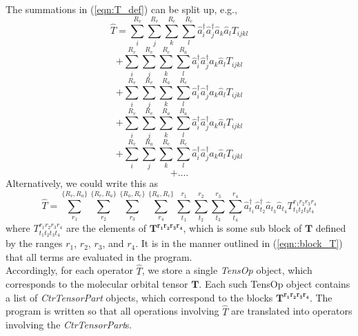 \documentclass[12pt]{article}
\begin{document}
\noindent The summations in  (\ref{eqn:T_def}) can be split up, e.g.,
\begin{equation*}
\hat{T} =  \sum_{i}^{R_{v}}\sum_{j}^{R_{v}}\sum_{k}^{R_{c}}\sum_{l}^{R_{c}}\hat{a}^{\dagger}_{i} \hat{a}^{\dagger}_{j} \hat{a}_{k} \hat{a}_{l} T_{ijkl}
\end{equation*}
\begin{equation*}
+  \sum_{i}^{R_{v}}\sum_{j}^{R_{v}}\sum_{k}^{R_{c}}\sum_{l}^{R_{a}}\hat{a}^{\dagger}_{i} \hat{a}^{\dagger}_{j} \hat{a}_{k} \hat{a}_{l} T_{ijkl}
\end{equation*}
\begin{equation*}
+ \sum_{i}^{R_{v}}\sum_{j}^{R_{v}}\sum_{k}^{R_{a}}\sum_{l}^{R_{c}}\hat{a}^{\dagger}_{i} \hat{a}^{\dagger}_{j} \hat{a}_{k} \hat{a}_{l} T_{ijkl}
\end{equation*}
\begin{equation*}
+ \sum_{i}^{R_{v}}\sum_{j}^{R_{v}}\sum_{k}^{R_{a}}\sum_{l}^{R_{a}}\hat{a}^{\dagger}_{i} \hat{a}^{\dagger}_{j} \hat{a}_{k} \hat{a}_{l} T_{ijkl}
\end{equation*}
\begin{equation*}
+ \sum_{i}^{R_{v}}\sum_{j}^{R_{a}}\sum_{k}^{R_{c}}\sum_{l}^{R_{c}}\hat{a}^{\dagger}_{i} \hat{a}^{\dagger}_{j} \hat{a}_{k} \hat{a}_{l} T_{ijkl}
\end{equation*}
\begin{equation*}
+ .... 
\end{equation*}
\noindent  Alternatively, we could write this as
\begin{equation*}
\hat{T} =
 \sum_{r_{1}}^{\{R_{v},R_{a}\}} \sum_{r_{2}}^{\{R_{v},R_{a}\}} \sum_{r_{3}}^{\{R_{a},R_{c}\}} \sum^{\{R_{a},R_{c}\}}_{r_{4}}
 \sum_{t_{1}}^{r_{1}}\sum_{t_{2}}^{r_{2}}\sum_{t_{3}}^{r_{3}}\sum_{t_{4}}^{r_{4}}
\hat{a}^{\dagger}_{t_{1}} \hat{a}^{\dagger}_{t_{2}} \hat{a}_{t_{3}} \hat{a}_{t_{4}} T^{r_{1}r_{2}r_{3}r_{4}}_{t_{1}t_{2}t_{3}t_{4}}
\label{eqn::block_T} 
\end{equation*}
\noindent where $T^{r_{1}r_{2}r_{3}r_{4}}_{t_{1}t_{2}t_{3}t_{4}}$ are the elements of $\mathbf{T^{r_{1}r_{2}r_{3}r_{4}}}$, which is some
sub block of $\mathbf{T}$ defined by the ranges $r_{1}$, $r_{2}$,
$r_{3}$, and $r_{4}$. It is in the manner outlined in (\ref{eqn::block_T}) that all terms are evaluated in the program.\\

\noindent Accordingly, for each operator $\hat{T}$, we store a single \emph{TensOp} object, which corresponds
to the molecular orbital tensor $\mathbf{T}$.  Each such TensOp object contains a list of \emph{CtrTensorPart}
objects, which correspond to the blocks $\mathbf{T^{r_{1}r_{2}r_{3}r_{4}}}$. The program is
written so that all operations involving $\hat{T}$ are translated into operators involving the \emph{CtrTensorPart}s.
\end{document}
